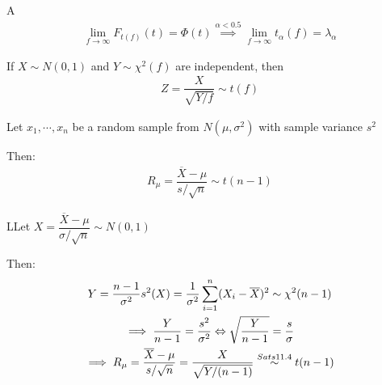 \par\bigskip
\begin{lem}
  A\begin{equation*}
    \begin{gathered}
      \lim_{f\to\infty}F_{t(f)}(t) = \Phi(t)\stackrel{\alpha<0.5}{\implies}\lim_{f\to\infty}t_\alpha(f) = \lambda_\alpha
    \end{gathered}
  \end{equation*}
\end{lem}
\par\bigskip
\begin{theo}{}
  If $X\sim N(0,1)$ and $Y\sim\chi^2(f)$ are independent, then
  \begin{equation*}
    \begin{gathered}
      Z = \dfrac{X}{\sqrt{Y/f}}\sim t(f)
    \end{gathered}
  \end{equation*}
\end{theo}
\par\bigskip
\begin{theo}{}
  Let $x_1,\cdots,x_n$ be a random sample from $N(\mu,\sigma^2)$ with sample variance $s^2$\par
  \noindent Then:
  \begin{equation*}
    \begin{gathered}
      R_\mu = \dfrac{\overline{X}-\mu}{s/\sqrt{n}}\sim t(n-1)
    \end{gathered}
  \end{equation*}
\end{theo}
\par\bigskip
\begin{prf}
  LLet $X = \dfrac{\overline{X}-\mu}{\sigma/\sqrt{n}}\sim N(0,1)$
  \par\noindent Then:
  \begin{equation*}
    \begin{gathered}
      Y = \dfrac{n-1}{\sigma^2}s^2(X) = \dfrac{1}{\sigma^2}\sum_{i=1}^{n}(X_i-\overline{X})^2\sim\chi^2(n-1)\\
      \implies\dfrac{Y}{n-1} = \dfrac{s^2}{\sigma^2} \Leftrightarrow \sqrt{\dfrac{Y}{n-1}} = \dfrac{s}{\sigma}\\
      \implies R_\mu = \dfrac{\overline{X}-\mu}{s/\sqrt{n}} = \dfrac{X}{\sqrt{Y/(n-1)}}\stackrel{Sats 11.4}{\sim}t(n-1)
    \end{gathered}
  \end{equation*}
\end{prf}
\par\bigskip

